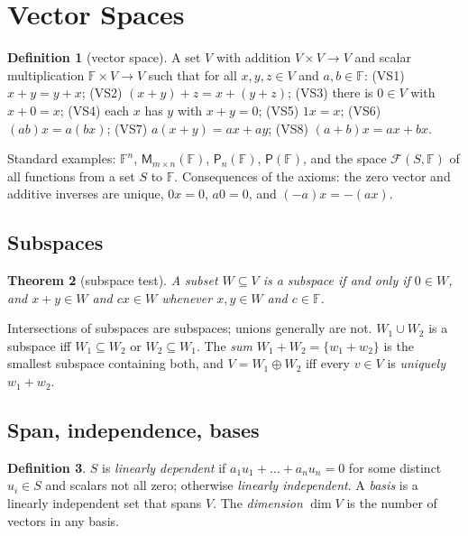 \documentclass[12pt]{article}
\newtheorem{theorem}{Theorem}[section]
\theoremstyle{definition}
\newtheorem{definition}[theorem]{Definition}
\theoremstyle{remark}
\newcommand{\F}{\mathbb{F}}
\newcommand{\M}{\mathsf{M}}
\newcommand{\Poly}{\mathsf{P}}
\begin{document}
\section{Vector Spaces}

\begin{definition}[vector space]
A set $V$ with addition $V\times V\to V$ and scalar multiplication $\F\times V\to V$ such that for all
$x,y,z\in V$ and $a,b\in\F$:
(VS1) $x+y=y+x$; (VS2) $(x+y)+z=x+(y+z)$; (VS3) there is $0\in V$ with $x+0=x$;
(VS4) each $x$ has $y$ with $x+y=0$; (VS5) $1x=x$; (VS6) $(ab)x=a(bx)$;
(VS7) $a(x+y)=ax+ay$; (VS8) $(a+b)x=ax+bx$.
\end{definition}

Standard examples: $\F^n$, $\M_{m\times n}(\F)$, $\Poly_n(\F)$, $\Poly(\F)$, and the space $\mathcal{F}(S,\F)$ of all
functions from a set $S$ to $\F$. Consequences of the axioms: the zero vector and additive inverses are
unique, $0x=0$, $a0=0$, and $(-a)x=-(ax)$.

\subsection{Subspaces}
\begin{theorem}[subspace test]
A subset $W\subseteq V$ is a subspace if and only if $0\in W$, and $x+y\in W$ and $cx\in W$
whenever $x,y\in W$ and $c\in\F$.
\end{theorem}
Intersections of subspaces are subspaces; unions generally are not. $W_1\cup W_2$ is a subspace iff
$W_1\subseteq W_2$ or $W_2\subseteq W_1$. The \emph{sum} $W_1+W_2=\{w_1+w_2\}$ is the smallest subspace containing both,
and $V=W_1\oplus W_2$ iff every $v\in V$ is \emph{uniquely} $w_1+w_2$.

\subsection{Span, independence, bases}
\begin{definition}
$S$ is \emph{linearly dependent} if $a_1u_1+\dots+a_nu_n=0$ for some distinct $u_i\in S$ and scalars not all zero;
otherwise \emph{linearly independent}. A \emph{basis} is a linearly independent set that spans $V$.
The \emph{dimension} $\dim V$ is the number of vectors in any basis.
\end{definition}
\end{document}
